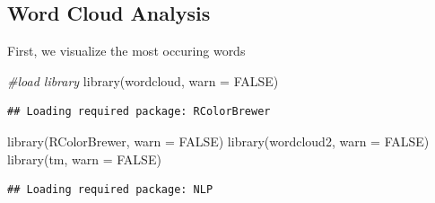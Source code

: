 \documentclass[
]{article}
\newenvironment{Shaded}{\begin{snugshade}}{\end{snugshade}}
\newcommand{\AttributeTok}[1]{\textcolor[rgb]{0.77,0.63,0.00}{#1}}
\newcommand{\CommentTok}[1]{\textcolor[rgb]{0.56,0.35,0.01}{\textit{#1}}}
\newcommand{\ConstantTok}[1]{\textcolor[rgb]{0.00,0.00,0.00}{#1}}
\newcommand{\FunctionTok}[1]{\textcolor[rgb]{0.00,0.00,0.00}{#1}}
\newcommand{\NormalTok}[1]{#1}
\begin{document}
\hypertarget{word-cloud-analysis}{%
\subsection{Word Cloud Analysis}\label{word-cloud-analysis}}

First, we visualize the most occuring words

\begin{Shaded}
\begin{Highlighting}[]
\CommentTok{\#load library}
\FunctionTok{library}\NormalTok{(wordcloud, }\AttributeTok{warn =} \ConstantTok{FALSE}\NormalTok{)}
\end{Highlighting}
\end{Shaded}

\begin{verbatim}
## Loading required package: RColorBrewer
\end{verbatim}

\begin{Shaded}
\begin{Highlighting}[]
\FunctionTok{library}\NormalTok{(RColorBrewer, }\AttributeTok{warn =} \ConstantTok{FALSE}\NormalTok{)}
\FunctionTok{library}\NormalTok{(wordcloud2, }\AttributeTok{warn =} \ConstantTok{FALSE}\NormalTok{)}
\FunctionTok{library}\NormalTok{(tm, }\AttributeTok{warn =} \ConstantTok{FALSE}\NormalTok{)}
\end{Highlighting}
\end{Shaded}

\begin{verbatim}
## Loading required package: NLP
\end{verbatim}
\end{document}
